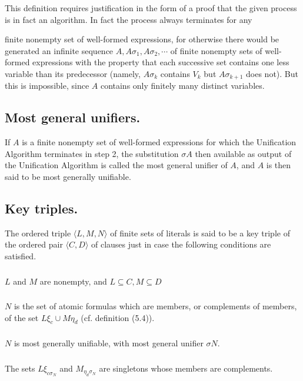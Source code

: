 \documentclass[8pt]{extarticle}
\begin{document}
This definition requires justification in the form of a proof that the given
process is in fact an algorithm. In fact the process always terminates for any

\newpage

finite nonempty set of well-formed expressions, for otherwise there would be
generated an infinite sequence $A, A\sigma_1,A\sigma_2,\dotsm$ of finite nonempty sets of well-formed expressions with the property that each successive set contains one less variable than its predecessor (namely, $A\sigma_k$ contains $V_k$ but $A\sigma_{k+1}$ does not). But this is impossible, since $A$ contains only finitely many distinct variables.

\subsection{Most general unifiers.}
If $A$ is a finite nonempty set of well-formed expressions for which the Unification Algorithm terminates in step 2, the substitution $\sigma A$ then available as output of the Unification Algorithm is called the most
general unifier of $A$, and $A$ is then said to be most generally unifiable.

\subsection{Key triples.}
The ordered triple $\langle L, M, N \rangle$ of finite sets of literals is said
to be a key triple of the ordered pair $\langle C,D\rangle$ of clauses just in case the following conditions are satisfied.

\subsubsection{}
$L$ and $M$ are nonempty, and $L \subseteq C, M \subseteq D$
\subsubsection{}
$N$ is the set of atomic formulas which are members, or complements
of members, of the set $L\xi_c\cup M\eta_d$ (cf. definition (5.4)).
\subsubsection{}
$N$ is most generally unifiable, with most general unifier $\sigma N$.
\subsubsection{}
The sets $L\xi_{c\sigma_N}$ and $M_{\eta_d\sigma_N}$ are singletons whose members are complements.
\end{document}

